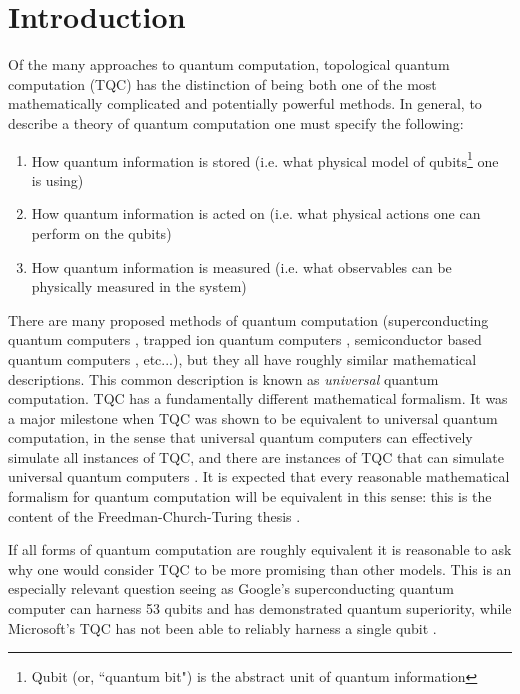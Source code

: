 \documentclass{article}
\theoremstyle{definition}
\numberwithin{figure}{section}
\begin{document}
\section{Introduction}
\label{Introduction}

Of the many approaches to quantum computation, topological quantum computation (TQC) has the distinction of being both one of the most mathematically complicated and potentially powerful methods. In general, to describe a theory of quantum computation one must specify the following:

\begin{enumerate}
\item How quantum information is stored (i.e. what physical model of qubits\footnote{Qubit (or, ``quantum bit") is the abstract unit of quantum information} one is using)
\item How quantum information is acted on (i.e. what physical actions one can perform on the qubits)
\item How quantum information is measured (i.e. what observables can be physically measured in the system)
\end{enumerate}


There are many proposed methods of quantum computation (superconducting quantum computers \cite{wendin2017quantum}, trapped ion quantum computers \cite{debnath2016demonstration}, semiconductor based quantum computers \cite{kane1998silicon}, etc...), but they all have roughly similar mathematical descriptions. This common description is known as \textit{universal} quantum computation. TQC has a fundamentally different mathematical formalism. It was a major milestone when TQC was shown to be equivalent to universal quantum computation, in the sense that universal quantum computers can effectively simulate all instances of TQC, and there are instances of TQC that can simulate universal quantum computers  \cite{freedman2002modular, freedman2002simulation}. It is expected that every reasonable mathematical formalism for quantum computation will be equivalent in this sense: this is the content of the Freedman-Church-Turing thesis \cite{freedman2003topological}.

If all forms of quantum computation are roughly equivalent it is reasonable to ask why one would consider TQC to be more promising than other models. This is an especially relevant question seeing as Google's superconducting quantum computer can harness 53 qubits and has demonstrated quantum superiority, while Microsoft's TQC has not been able to reliably harness a single qubit \cite{arute2019quantum}.
\end{document}
